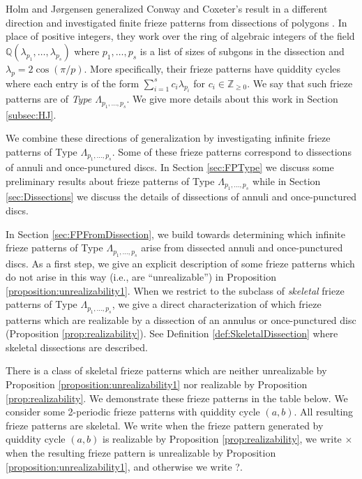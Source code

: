 \documentclass[12pt]{article}
\theoremstyle{remark}
\begin{document}
Holm and J{\o}rgensen generalized Conway and Coxeter's result in a different direction and investigated finite frieze patterns from dissections of polygons \cite{14}. In place of positive integers, they work over the ring of algebraic integers of the field $\mathbb{Q}(\lambda_{p_1},\ldots,\lambda_{p_s})$ where $p_1,\ldots,p_s$ is a list of sizes of subgons in the dissection and $\lambda_p = 2\cos(\pi/p)$. More specifically, their frieze patterns have quiddity cycles where each entry is of the form $\sum_{i=1}^s c_i \lambda_{p_i}$ for $c_i \in \mathbb{Z}_{\geq 0}$. We say that such frieze patterns are of \emph{Type $\Lambda_{p_1,\ldots,p_s}$}. We give more details about this work in Section \ref{subsec:HJ}.


We combine these directions of generalization by investigating infinite frieze patterns of Type $\Lambda_{p_1,\ldots,p_s}$. Some of these frieze patterns correspond to dissections of annuli and once-punctured discs.  In Section \ref{sec:FPType} we discuss some preliminary results about frieze patterns of Type $\Lambda_{p_1,\ldots,p_s}$ while in Section \ref{sec:Dissections} we discuss the details of dissections of annuli and once-punctured discs.

In Section \ref{sec:FPFromDissection}, we build towards determining which infinite frieze patterns of Type $\Lambda_{p_1,\ldots,p_s}$ arise from dissected annuli and once-punctured discs. As a first step, we give an explicit description of some frieze patterns which do not arise in this way (i.e., are ``unrealizable'') in Proposition \ref{proposition:unrealizability1}. When we restrict to the subclass of \emph{skeletal} frieze patterns of Type $\Lambda_{p_1,\ldots,p_s}$, we give a direct characterization of which frieze patterns which are realizable by a dissection of an annulus or once-punctured disc (Proposition \ref{prop:realizability}). See Definition \ref{def:SkeletalDissection} where skeletal dissections are described.

There is a class of skeletal frieze patterns which are neither unrealizable by Proposition \ref{proposition:unrealizability1} nor realizable by Proposition \ref{prop:realizability}. We demonstrate these frieze patterns in the table below. We consider some 2-periodic frieze patterns with quiddity cycle $(a,b)$. All resulting frieze patterns are skeletal. We write \checkmark when the frieze pattern generated by quiddity cycle $(a,b)$ is realizable by Proposition \ref{prop:realizability}, we write $\times$ when the resulting frieze pattern is unrealizable by Proposition \ref{proposition:unrealizability1}, and otherwise we write ?.
\end{document}
